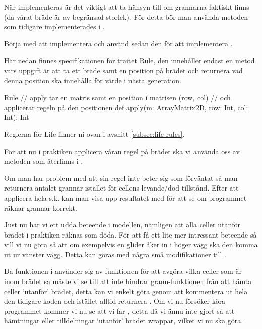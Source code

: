         När  implementeras är det viktigt att ta hänsyn till om grannarna faktiskt finns (då vårat bräde är av begränsad storlek).
        För detta bör man använda  metoden som tidigare implementerades i .
        
        Börja med att implementera  och använd sedan den för att implementera .

        Här nedan finnes specifikationen för traitet Rule, den innehåller endast en metod  vars uppgift är att ta ett bräde samt en position på brädet och returnera vad denna position ska innehålla för värde i nästa generation.

\begin{ScalaSpec}{Rule}
// apply tar en matris samt en position i matrisen (row, col)
// och applicerar regeln på den positionen
def apply(m: ArrayMatrix2D, row: Int, col: Int): Int
\end{ScalaSpec}
        
        Reglerna för Life finner ni ovan i avsnitt \ref{subsec:life-rules}.

        
        För att nu i praktiken applicera våran regel på brädet ska vi använda oss av metoden  som återfinns i .

        Om man har problem med att sin regel inte beter sig som förväntat så man returnera antalet grannar istället för cellens levande/död tillstånd. Efter att applicera hela s.k.  kan man visa upp resultatet med  för att se om programmet räknar grannar korrekt.


    
    Just nu har vi ett udda beteende i modellen, nämligen att alla celler utanför brädet i praktiken räknas som döda. För att få ett lite mer intressant beteende så vill vi nu göra så att om exempelvis en glider åker in i höger vägg ska den komma ut ur vänster vägg. Detta kan göras med några små modifikationer till .


        Då funktionen  i  använder sig av funktionen  för att avgöra vilka celler som är inom brädet så måste vi se till att  inte hindrar grann-funktionen från att hämta celler `utanför' brädet, detta kan vi enkelt göra genom att kommentera ut hela den tidigare koden och istället alltid returnera . Om vi nu försöker köra programmet kommer vi nu se att vi får , detta då vi ännu inte gjort så att hämtningar eller tilldelningar `utanför' brädet wrappar, vilket vi nu ska göra.

